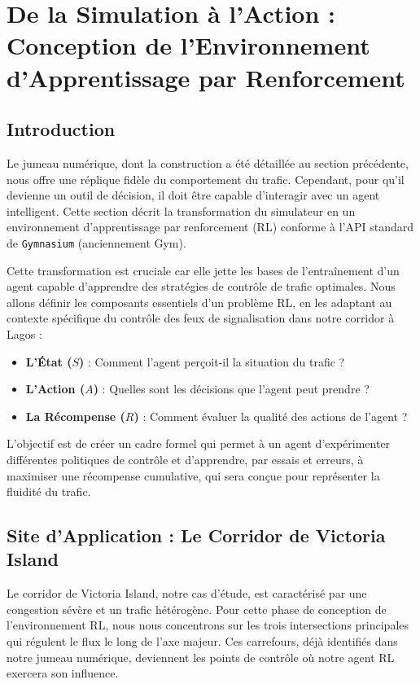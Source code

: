 \section{De la Simulation à l'Action : Conception de l'Environnement d'Apprentissage par Renforcement}
\label{sec:conception_implementation}

\subsection{Introduction}
\label{sec:ch6_intro}

Le jumeau numérique, dont la construction a été détaillée au section précédente, nous offre une réplique fidèle du comportement du trafic. Cependant, pour qu'il devienne un outil de décision, il doit être capable d'interagir avec un agent intelligent. Cette section décrit la transformation du simulateur en un environnement d'apprentissage par renforcement (RL) conforme à l'API standard de \texttt{Gymnasium} (anciennement Gym).

Cette transformation est cruciale car elle jette les bases de l'entraînement d'un agent capable d'apprendre des stratégies de contrôle de trafic optimales. Nous allons définir les composants essentiels d'un problème RL, en les adaptant au contexte spécifique du contrôle des feux de signalisation dans notre corridor à Lagos :
\begin{itemize}
    \item \textbf{L'État ($S$)} : Comment l'agent perçoit-il la situation du trafic ?
    \item \textbf{L'Action ($A$)} : Quelles sont les décisions que l'agent peut prendre ?
    \item \textbf{La Récompense ($R$)} : Comment évaluer la qualité des actions de l'agent ?
\end{itemize}

L'objectif est de créer un cadre formel qui permet à un agent d'expérimenter différentes politiques de contrôle et d'apprendre, par essais et erreurs, à maximiser une récompense cumulative, qui sera conçue pour représenter la fluidité du trafic.

\subsection{Site d'Application : Le Corridor de Victoria Island}
\label{sec:ch6_site_application}

Le corridor de Victoria Island, notre cas d'étude, est caractérisé par une congestion sévère et un trafic hétérogène. Pour cette phase de conception de l'environnement RL, nous nous concentrons sur les trois intersections principales qui régulent le flux le long de l'axe majeur. Ces carrefours, déjà identifiés dans notre jumeau numérique, deviennent les points de contrôle où notre agent RL exercera son influence.

